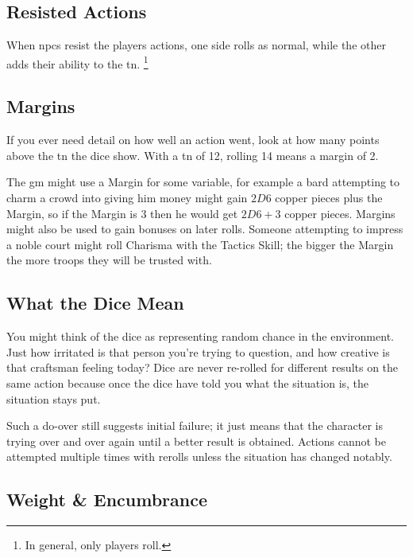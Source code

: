 \begin{multicols}{2}
\subsection{Resisted Actions}
\label{resistedactions}

When \glspl{npc} resist the players actions, one side rolls as normal, while the other adds their ability to the \gls{tn}.
\footnote{In general, only players roll.}

\subsection{Margins}
\label{margin}

If you ever need detail on how well an action went, look at how many points above the \gls{tn} the dice show.
With a \gls{tn} of 12, rolling 14 means a margin of 2.

The \gls{gm} might use a Margin for some variable, for example a bard attempting to charm a crowd into giving him money might gain $2D6$ copper pieces plus the Margin, so if the Margin is 3 then he would get $2D6+3$ copper pieces.
Margins might also be used to gain bonuses on later rolls.
Someone attempting to impress a noble court might roll Charisma with the Tactics Skill; the bigger the Margin the more troops they will be trusted with.

\subsection{What the Dice Mean}

You might think of the dice as representing random chance in the environment. Just how irritated is that person you're trying to question, and how creative is that craftsman feeling today? Dice are never re-rolled for different results on the same action because once the dice have told you what the situation is, the situation stays put.

Such a do-over still suggests initial failure; it just means that the character is trying over and over again until a better result is obtained.
Actions cannot be attempted multiple times with rerolls unless the situation has changed notably.

\end{multicols}

\subsection{Weight \& Encumbrance}
\label{weight}

